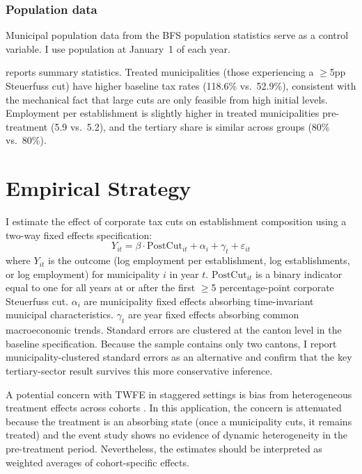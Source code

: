\documentclass[12pt]{article}
\begin{document}
\subsubsection*{Population data} Municipal population data from the BFS population statistics serve as a control variable. I use population at January~1 of each year.



 reports summary statistics. Treated municipalities (those experiencing a $\geq$5pp Steuerfuss cut) have higher baseline tax rates (118.6\% vs.\ 52.9\%), consistent with the mechanical fact that large cuts are only feasible from high initial levels. Employment per establishment is slightly higher in treated municipalities pre-treatment (5.9 vs.\ 5.2), and the tertiary share is similar across groups (80\% vs.\ 80\%).

\section{Empirical Strategy}

I estimate the effect of corporate tax cuts on establishment composition using a two-way fixed effects specification:
\begin{equation}
Y_{it} = \beta \cdot \text{PostCut}_{it} + \alpha_i + \gamma_t + \varepsilon_{it}
\label{eq:main}
\end{equation}
where $Y_{it}$ is the outcome (log employment per establishment, log establishments, or log employment) for municipality $i$ in year $t$. $\text{PostCut}_{it}$ is a binary indicator equal to one for all years at or after the first $\geq$5 percentage-point corporate Steuerfuss cut. $\alpha_i$ are municipality fixed effects absorbing time-invariant municipal characteristics. $\gamma_t$ are year fixed effects absorbing common macroeconomic trends. Standard errors are clustered at the canton level in the baseline specification. Because the sample contains only two cantons, I report municipality-clustered standard errors as an alternative and confirm that the key tertiary-sector result survives this more conservative inference.

A potential concern with TWFE in staggered settings is bias from heterogeneous treatment effects across cohorts \citep{callaway2021difference, sun2021estimating}. In this application, the concern is attenuated because the treatment is an absorbing state (once a municipality cuts, it remains treated) and the event study shows no evidence of dynamic heterogeneity in the pre-treatment period. Nevertheless, the estimates should be interpreted as weighted averages of cohort-specific effects.
\end{document}
